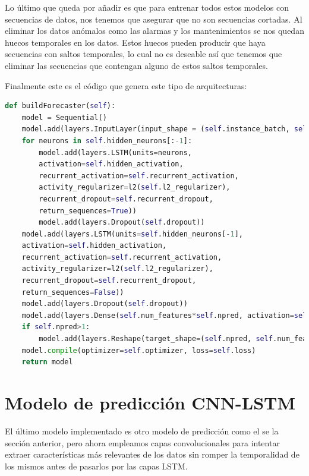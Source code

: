 Lo último que queda por añadir es que para entrenar todos estos modelos con secuencias de datos, nos tenemos que asegurar que no son secuencias cortadas. Al eliminar los datos anómalos como las alarmas y los mantenimientos se nos quedan huecos temporales en los datos. Estos huecos pueden producir que haya secuencias con saltos temporales, lo cual no es deseable así que tenemos que eliminar las secuencias que contengan alguno de estos saltos temporales.

Finalmente este es el código que genera este tipo de arquitecturas:

\begin{lstlisting}[language=Python]
def buildForecaster(self):
	model = Sequential()
	model.add(layers.InputLayer(input_shape = (self.instance_batch, self.num_features)))
	for neurons in self.hidden_neurons[:-1]:
		model.add(layers.LSTM(units=neurons,
		activation=self.hidden_activation,
		recurrent_activation=self.recurrent_activation,
		activity_regularizer=l2(self.l2_regularizer),
		recurrent_dropout=self.recurrent_dropout,
		return_sequences=True))
		model.add(layers.Dropout(self.dropout))
	model.add(layers.LSTM(units=self.hidden_neurons[-1],
	activation=self.hidden_activation,
	recurrent_activation=self.recurrent_activation,
	activity_regularizer=l2(self.l2_regularizer),
	recurrent_dropout=self.recurrent_dropout,
	return_sequences=False))
	model.add(layers.Dropout(self.dropout))
	model.add(layers.Dense(self.num_features*self.npred, activation=self.output_activation, activity_regularizer = l2(self.l2_regularizer)))
	if self.npred>1:
		model.add(layers.Reshape(target_shape=(self.npred, self.num_features)))
	model.compile(optimizer=self.optimizer, loss=self.loss)
	return model
\end{lstlisting}

\section{Modelo de predicción CNN-LSTM}

El último modelo implementado es otro modelo de predicción como el se la sección anterior, pero ahora empleamos capas convolucionales para intentar extraer características más relevantes de los datos sin romper la temporalidad de los mismos antes de pasarlos por las capas LSTM.


